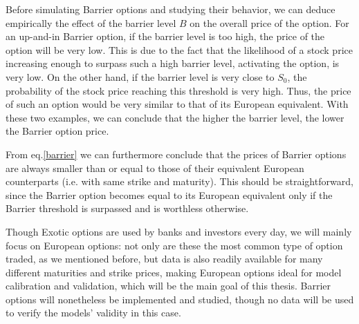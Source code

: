 Before simulating Barrier options and studying their behavior, we can deduce empirically the effect of the barrier level $B$ on the overall price of the option. For an up-and-in Barrier option, if the barrier level is too high, the price of the option will be very low. This is due to the fact that the likelihood of a stock price increasing enough to surpass such a high barrier level, activating the option, is very low. On the other hand, if the barrier level is very close to $S_0$, the probability of the stock price reaching this threshold is very high. Thus, the price of such an option would be very similar to that of its European equivalent.
With these two examples, we can conclude that the higher the barrier level, the lower the Barrier option price.

From eq.\eqref{barrier} we can furthermore conclude that the prices of Barrier options are always smaller than or equal to those of their equivalent European counterparts (i.e. with same strike and maturity). This should be straightforward, since the Barrier option becomes equal to its European equivalent only if the Barrier threshold is surpassed and is worthless otherwise.




Though Exotic options are used by banks and investors every day, we will mainly focus on European options: not only are these the most common type of option traded, as we mentioned before, but data is also readily available for many different maturities and strike prices, making European options ideal for model calibration and validation, which will be the main goal of this thesis.
Barrier options will nonetheless be implemented and studied, though no data will be used to verify the models' validity in this case.


